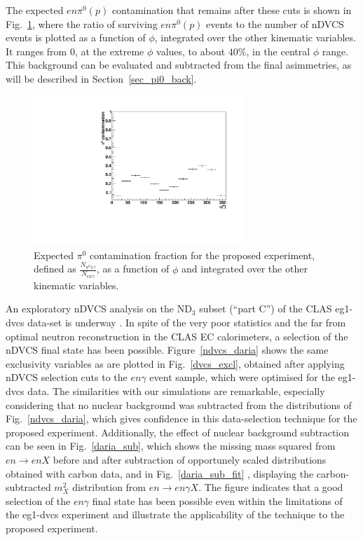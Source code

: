 The expected $en\pi^0(p)$ contamination that remains after these cuts is shown in Fig.~\ref{ndvcs-pi0}, where the ratio of surviving $en\pi^0(p)$ events to the number of nDVCS events is plotted as a function of $\phi$, integrated over the other kinematic variables. It ranges from 0, at the extreme $\phi$ values, to about $40\%$, in the central $\phi$ range. This background can be evaluated and subtracted from the final asimmetries, as will be described in Section~\ref{sec_pi0_back}. 

\begin{figure}  
\begin{center}
\includegraphics[width=80mm]{pi0_integrated_100days_noFT.pdf}
\caption [Expected $\pi^0$ contamination fraction as a function of $\phi$]
{Expected $\pi^0$ contamination fraction for the proposed experiment, defined as $\frac{N_{\pi^{0} 1\gamma}}{N_{en\gamma}}$, as a function of $\phi$ and integrated over the other kinematic variables. }
\label{ndvcs-pi0}
\end{center}
\end{figure}

An exploratory nDVCS analysis on the ND$_3$ subset (``part C'') of the CLAS
eg1-dvcs data-set is underway \cite{daria_eg1dvcs}. In spite of the very poor
statistics and the far from optimal neutron reconstruction in the CLAS
EC calorimeters, a selection of the nDVCS final state has been possible.
Figure~\ref{ndvcs_daria} shows the same exclusivity variables as are plotted in
Fig.~\ref{dvcs_excl}, obtained after applying nDVCS selection cuts to the $en\gamma$ event sample, which were optimised for the eg1-dvcs data. The similarities with our simulations are remarkable, especially considering that no nuclear background was subtracted from the distributions of Fig.~\ref{ndvcs_daria}, which gives confidence in this data-selection technique for the proposed experiment. Additionally, the effect of nuclear background subtraction can be seen in Fig.~\ref{daria_sub}, which shows the missing mass squared from $en\to enX$ before and after subtraction of opportunely scaled distributions obtained with carbon data,
and in Fig.~\ref{daria_sub_fit} , displaying the carbon-subtracted $m_{X}^{2}$ 
distribution from $en \to en\gamma X$. The figure indicates that a good selection of the $en\gamma$ final state has been possible even within the limitations 
of the eg1-dvcs experiment and illustrate the applicability of the 
technique to the proposed experiment.

